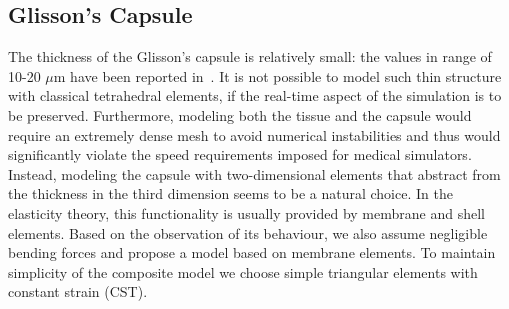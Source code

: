 \documentclass{acm_proc_article-sp}
\begin{document}



\subsection{Glisson's Capsule} %
\label{ss:capsuleModel}
The thickness of the Glisson's capsule is relatively small: the values in range of 10-20
$\mu$m have been reported in~\cite{Umale2011}.
It is not possible to model such thin structure with classical tetrahedral
elements, if the real-time aspect of the simulation is to be preserved.
Furthermore, modeling both the tissue and the capsule would require an extremely 
dense mesh to avoid numerical instabilities and thus would significantly
violate the speed requirements imposed for medical simulators.
Instead, modeling the capsule with two-dimensional elements that abstract from the
thickness in the third dimension seems
to be a natural choice. In the elasticity theory, this functionality is usually provided by membrane and shell elements.
Based on the observation of its behaviour, we also
assume negligible bending forces and propose a model based on membrane
elements. 
To maintain simplicity of the composite model we choose simple triangular
elements with constant strain (CST).
\end{document}
